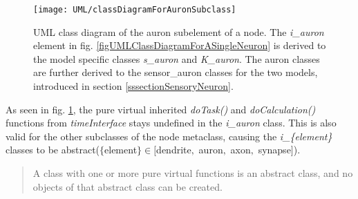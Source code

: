 \begin{figure}[htb!p]
	\centering
	\centerline{ %
	\texttt{[image: UML/classDiagramForAuronSubclass]}}
	\caption[UML class diagram for the auron subelement of a node, $NIM$ and $\kappa M$]{
		UML class diagram of the auron subelement of a node.
		The \emph{i\_auron} element in fig. \ref{figUMLClassDiagramForASingleNeuron} is derived to the model specific classes \emph{s\_auron} and \emph{K\_auron}.
		The auron classes are further derived to the sensor\_auron classes for the two models, introduced in section \ref{sssectionSensoryNeuron}.
		}
	\label{figUMLClassDiagramForAuronElementForNIMandKM}
\end{figure}

		As seen in fig. \ref{figUMLClassDiagramForAuronElementForNIMandKM}, the pure virtual inherited \emph{doTask()} and \emph{doCalculation()} functions from \emph{timeInterface} stays undefined in the \emph{i\_auron} class.
		This is also valid for the other subclasses of the node metaclass, causing the \emph{i\_\{element\}} classes to be abstract($\{$element$\} \in [$dendrite$,$ auron$,$ axon$,$ synapse$]$)\cite{Stroustrup2000KAP12}.
\begin{quote}
	A class with one or more pure virtual functions is an abstract class, and no objects of that abstract class can be created. \cite{Stroustrup2000KAP12}
\end{quote}

